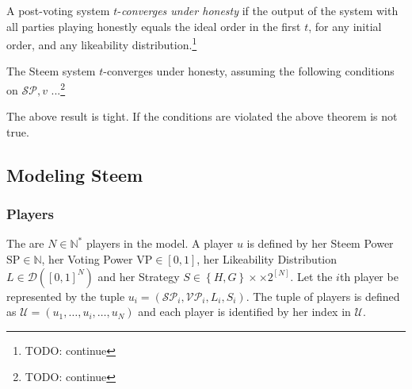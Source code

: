     \begin{definition}
      A post-voting system $t$-\emph{converges under honesty} if the output of
      the system with all parties playing honestly equals the ideal order in the
      first $t$, for any initial order, and any likeability
      distribution.\footnote{TODO: continue}
    \end{definition}

    \begin{theorem}
      The Steem system $t$-converges under honesty, assuming the following
      conditions on $\mathcal{SP}, v$ ...\footnote{TODO: continue}
    \end{theorem}

    The above result is tight.
    If the conditions are violated the above theorem is not true.

  \subsection{Modeling Steem}
    \subsubsection*{Players}
      The are $N \in \mathbb{N}^{*}$ players in the model. A player $u$ is
      defined by her Steem Power $\mathrm{SP} \in \mathbb{N}$, her Voting Power
      $\mathrm{VP} \in \left[0, 1\right]$, her Likeability Distribution $L \in
      \mathcal{D} \left(\left[0, 1\right]^N\right)$ and her Strategy $S \in
      \left\{H, G\right\} \times \times 2^{\left[N\right]}$. Let the $i$th
      player be represented by the tuple $u_i = \left(\mathcal{SP}_i,
      \mathcal{VP}_i, L_i, S_i\right)$. The tuple of players is defined as
      $\mathcal{U} = \left(u_1, \dots, u_i, \dots, u_N\right)$ and each player
      is identified by her index in $\mathcal{U}$.

